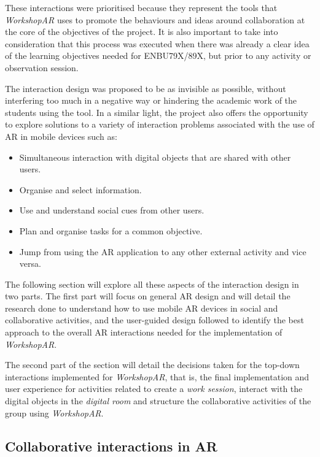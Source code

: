 These interactions were prioritised because they represent the tools that \emph{WorkshopAR} uses to promote the behaviours and ideas around collaboration at the core of the objectives of
the project. It is also important to take into consideration that this process was executed when there was already a clear idea of the learning objectives needed for ENBU79X/89X, but prior
to any activity or observation session.

The interaction design was proposed to be as invisible as possible, without interfering too much in a negative way or hindering the academic work of the
students using the tool. In a similar light, the project also offers the opportunity to explore solutions to a variety of interaction problems associated with the use of AR in mobile
devices such as:

\begin{itemize}
    \item Simultaneous interaction with digital objects that are shared with other users.
    \item Organise and select information.
    \item Use and understand social cues from other users.
    \item Plan and organise tasks for a common objective.
    \item Jump from using the \ac{AR} application to any other external activity and vice versa.
\end{itemize}

The following section will explore all these aspects of the interaction design in two parts. The first part will focus on general \ac{AR} design and will detail the research done to
understand how to use mobile \ac{AR} devices in social and collaborative activities, and the user-guided design followed to identify the best approach to the overall \ac{AR} interactions
needed for the implementation of \emph{WorkshopAR}.

The second part of the section will detail the decisions taken for the top-down interactions implemented for \emph{WorkshopAR}, that is, the final implementation and user experience for
activities related to create a \emph{work session}, interact with the digital objects in the \emph{digital room} and structure the collaborative activities of the group using \emph{WorkshopAR}.

\subsection{Collaborative interactions in AR \label{sec:5-1-1}}

